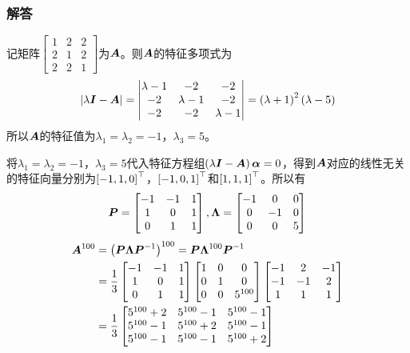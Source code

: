 \documentclass{beamer}
\begin{document}
\begin{frame}[allowframebreaks]
    \frametitle{解答}
    记矩阵\(\begin{bmatrix}1&2&2\\2&1&2\\2&2&1\end{bmatrix}\)为\(\boldsymbol{A}\)。则\(\boldsymbol{A}\)的特征多项式为
    \begin{equation*}
        \left|\lambda\boldsymbol{I}-\boldsymbol{A} \right|=\begin{vmatrix}\lambda-1&-2&-2\\-2&\lambda-1&-2\\-2&-2&\lambda-1\end{vmatrix}=\left( \lambda+1 \right)^2\left( \lambda-5 \right)
    \end{equation*}
    所以\(\boldsymbol{A}\)的特征值为\(\lambda_1=\lambda_2=-1\)，\(\lambda_3=5\)。

    将\(\lambda_1=\lambda_2=-1\)，\(\lambda_3=5\)代入特征方程组\(\left( \lambda\boldsymbol{I}-\boldsymbol{A} \right)\boldsymbol{\alpha}=0\)，得到\(\boldsymbol{A}\)对应的线性无关的特征向量分别为\(\left[ -1,1,0 \right]^\top\)，\(\left[ -1,0,1 \right]^\top\)和\(\left[ 1,1,1 \right]^\top\)。所以有
    \begin{equation*}
        \boldsymbol{P}=\begin{bmatrix}-1&-1&1\\1&0&1\\0&1&1\end{bmatrix},\boldsymbol{\Lambda}=\begin{bmatrix}-1&0&0\\0&-1&0\\0&0&5\end{bmatrix}
    \end{equation*}
    \begin{align*}
        \boldsymbol{A}^{100} & =\left( \boldsymbol{P}\boldsymbol{\Lambda}{\boldsymbol{P}}^{-1} \right)^{100}=\boldsymbol{P}\boldsymbol{\Lambda}^{100}{\boldsymbol{P}}^{-1}                                                                                                  \\
                    & =\frac{1}{3}\begin{bmatrix}-1&-1&1\\1&0&1\\0&1&1\end{bmatrix}\begin{bmatrix}1&0&0\\0&1&0\\0&0&5^{100}\end{bmatrix}\begin{bmatrix}-1&2&-1\\-1&-1&2\\1&1&1\end{bmatrix} \\
                    & =\frac{1}{3}\begin{bmatrix}5^{100}+2&5^{100}-1&5^{100}-1\\5^{100}-1&5^{100}+2&5^{100}-1\\5^{100}-1&5^{100}-1&5^{100}+2\end{bmatrix}
    \end{align*}
\end{frame}
\end{document}
